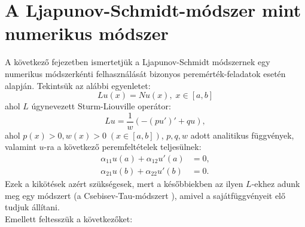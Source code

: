 \documentclass[oneside, titlepage, 12pt, a4paper]{report}
\begin{document}
\onehalfspacing
\chapter{A Ljapunov-Schmidt-módszer mint numerikus módszer}
\label{chap:numeric}

A következő fejezetben ismertetjük a Ljapunov-Schmidt módszernek egy numerikus módszerkénti felhasználását bizonyos peremérték-feladatok esetén \cite{LSNum} alapján. %
Tekintsük az alábbi egyenletet:
\begin{equation}
Lu(x) = Nu(x),\;x\in[a, b] \label{eq:num:1}
\end{equation}
ahol $L$ úgynevezett Sturm-Liouville operátor:
\begin{equation*}
L u = \frac{1}{w} ( -(p u')' + q u),
\end{equation*}
ahol $p(x) > 0, w(x) > 0\;(x \in [a, b])$, $p, q, w$ adott analitikus függvények, valamint $u$-ra a következő peremfeltételek teljesülnek:
\begin{align*}
\alpha_{11}u(a) + \alpha_{12}u'(a) &= 0, \\
\alpha_{21}u(b) + \alpha_{22}u'(b) &= 0.
\end{align*}
Ezek a kikötések azért szükségesek, mert a későbbiekben az ilyen $L$-ekhez adunk meg egy módszert (a Csebisev-Tau-módszert \cite{ChebysevTau}), amivel a sajátfüggvényeit elő tudjuk állítani. \\ %
Emellett feltesszük a következőket:
\end{document}
